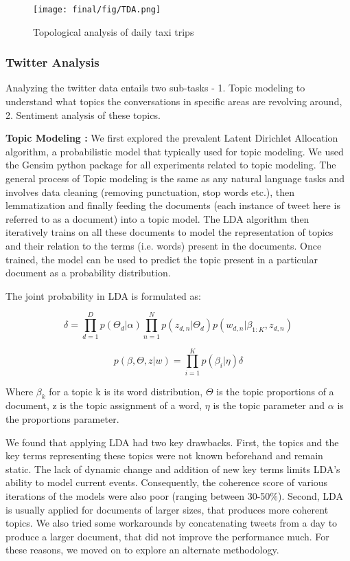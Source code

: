 \begin{figure}[ht]
 \centering %
 \texttt{[image: final/fig/TDA.png]}
 \caption{Topological analysis of daily taxi trips}
 \label{fig:dailytrends}
\end{figure}


\subsubsection{Twitter Analysis}

Analyzing the twitter data entails two sub-tasks - 1. Topic modeling to understand what topics the conversations in specific areas are revolving around, 2. Sentiment analysis of these topics.

\textbf{Topic Modeling : }
We first explored the prevalent Latent Dirichlet Allocation algorithm, a probabilistic model that typically used for topic modeling. We used the Gensim \cite{gensim} python package for all experiments related to topic modeling. The general process of Topic modeling is the same as any natural language tasks and involves data cleaning (removing punctuation, stop words etc.), then lemmatization and finally feeding the documents (each instance of tweet here is referred to as a document) into a topic model. The LDA algorithm then iteratively trains on all these documents to model the representation of topics and their relation to the terms (i.e. words) present in the documents. Once trained, the model can be used to predict the topic present in a particular document as a probability distribution.

The joint probability in LDA is formulated as:

$${\delta = \prod_{d=1}^{D} p(\Theta_d|\alpha) 
\prod_{n=1}^{N} p(z_{d,n}|\Theta_d)p(w_{d,n}|\beta_{1:K},z_{d,n})}$$

$${p(\beta, \Theta, z | w) = \prod_{i=1}^{K} p(\beta_i | \eta) \delta
}$$

Where $\beta_k$ for a topic k is its word distribution, $\Theta$ is the topic proportions of a document, z is the topic assignment of a word, $\eta$ is the topic parameter and $\alpha$ is the proportions parameter.

We found that applying LDA had two key drawbacks. First, the topics and the key terms representing these topics were not known beforehand and remain static. The lack of dynamic change and addition of new key terms limits LDA's ability to model current events. Consequently, the coherence score of various iterations of the models were also poor (ranging between 30-50\%). Second, LDA is usually applied for documents of larger sizes, that produces more coherent topics. We also tried some workarounds by concatenating tweets from a day to produce a larger document, that did not improve the performance much. For these reasons, we moved on to explore an alternate methodology.

